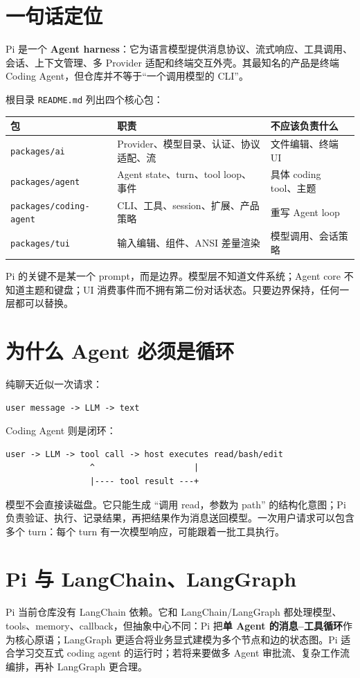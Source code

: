 \documentclass[UTF8,openany,11pt]{ctexbook}
\newcommand{\pathref}[1]{\texttt{#1}}
\newcommand{\term}[1]{\textbf{#1}}
\begin{document}
\section{一句话定位}
Pi 是一个 \term{Agent harness}：它为语言模型提供消息协议、流式响应、工具调用、会话、上下文管理、多 Provider 适配和终端交互外壳。其最知名的产品是终端 Coding Agent，但仓库并不等于“一个调用模型的 CLI”。

根目录 \pathref{README.md} 列出四个核心包：
\begin{longtable}{p{}p{}p{}}
\toprule
包 & 职责 & 不应该负责什么\\
\midrule
\texttt{packages/ai} & Provider、模型目录、认证、协议适配、流 & 文件编辑、终端 UI\\
\texttt{packages/agent} & Agent state、turn、tool loop、事件 & 具体 coding tool、主题\\
\texttt{packages/coding-agent} & CLI、工具、session、扩展、产品策略 & 重写 Agent loop\\
\texttt{packages/tui} & 输入编辑、组件、ANSI 差量渲染 & 模型调用、会话策略\\
\bottomrule
\end{longtable}

\begin{keypoint}
Pi 的关键不是某一个 prompt，而是边界。模型层不知道文件系统；Agent core 不知道主题和键盘；UI 消费事件而不拥有第二份对话状态。只要边界保持，任何一层都可以替换。
\end{keypoint}

\section{为什么 Agent 必须是循环}
纯聊天近似一次请求：
\begin{Verbatim}[fontsize=\small]
user message -> LLM -> text
\end{Verbatim}
Coding Agent 则是闭环：
\begin{Verbatim}[fontsize=\small]
user -> LLM -> tool call -> host executes read/bash/edit
                 ^                    |
                 |---- tool result ---+
\end{Verbatim}
模型不会直接读磁盘。它只能生成 ``调用 read，参数为 path'' 的结构化意图；Pi 负责验证、执行、记录结果，再把结果作为消息送回模型。一次用户请求可以包含多个 turn：每个 turn 有一次模型响应，可能跟着一批工具执行。

\section{Pi 与 LangChain、LangGraph}
Pi 当前仓库没有 LangChain 依赖。它和 LangChain/LangGraph 都处理模型、tools、memory、callback，但抽象中心不同：Pi 把\term{单 Agent 的消息--工具循环}作为核心原语；LangGraph 更适合将业务显式建模为多个节点和边的状态图。Pi 适合学习交互式 coding agent 的运行时；若将来要做多 Agent 审批流、复杂工作流编排，再补 LangGraph 更合理。
\end{document}
